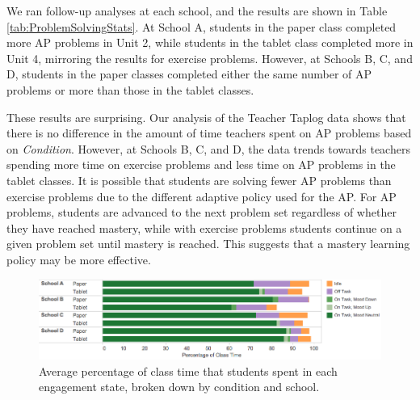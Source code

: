 \documentclass{sigchi}
\begin{document}
We ran follow-up analyses at each school, and the results are shown in Table \ref{tab:ProblemSolvingStats}. At School A, students in the paper class completed more AP problems in Unit 2, while students in the tablet class completed more in Unit 4, mirroring the results for exercise problems. However, at Schools B, C, and D, students in the paper classes completed either the same number of AP problems or more than those in the tablet classes. 

These results are surprising. Our analysis of the Teacher Taplog data shows that there is no difference in the amount of time teachers spent on AP problems based on \emph{Condition}. However, at Schools B, C, and D, the data trends towards teachers spending more time on exercise problems and less time on AP problems in the tablet classes. It is possible that students are solving fewer AP problems than exercise problems due to the different adaptive policy used for the AP. For AP problems, students are advanced to the next problem set regardless of whether they have reached mastery, while with exercise problems students continue on a given problem set until mastery is reached. This suggests that a mastery learning policy may be more effective.


\begin{figure}[t]
\centering
\includegraphics[width=130mm]{images/engagement.png}
\caption{Average percentage of class time that students spent in each engagement state, broken down by condition and school.}
\label{fig:ProblemSolvingEX}
\end{figure}
\end{document}
